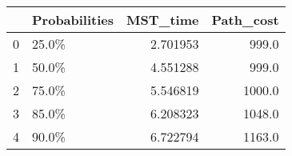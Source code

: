 \begin{tabular}{llrr}
\toprule
{} & Probabilities &  MST\_time &  Path\_cost \\
\midrule
0 &         25.0\% &  2.701953 &      999.0 \\
1 &         50.0\% &  4.551288 &      999.0 \\
2 &         75.0\% &  5.546819 &     1000.0 \\
3 &         85.0\% &  6.208323 &     1048.0 \\
4 &         90.0\% &  6.722794 &     1163.0 \\
\bottomrule
\end{tabular}
